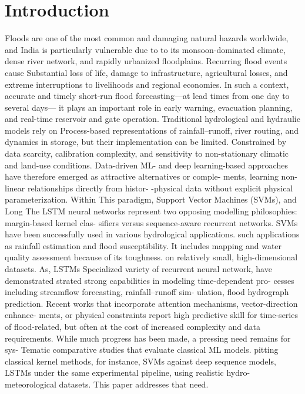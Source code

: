\documentclass[conference]{IEEEtran}
\begin{document}
\section{Introduction}
Floods are one of the most common and damaging natural
hazards worldwide, and India is particularly vulnerable due to
to its monsoon-dominated climate, dense river network, and
rapidly urbanized floodplains. Recurring flood events cause
Substantial loss of life, damage to infrastructure, agricultural
losses, and extreme interruptions to livelihoods and regional
economies. In such a context, accurate and timely short-run
flood forecasting—at lead times from one day to several days—
it plays an important role in early warning, evacuation planning, and
real-time reservoir and gate operation.
Traditional hydrological and hydraulic models rely on
Process-based representations of rainfall–runoff, river routing,
and dynamics in storage, but their implementation can be limited.
Constrained by data scarcity, calibration complexity, and sensitivity to
non-stationary climatic and land-use conditions. Data-driven
ML- and deep learning-based approaches
have therefore emerged as attractive alternatives or comple-
ments, learning non-linear relationships directly from histor-
-physical data without explicit physical parameterization. Within
This paradigm, Support Vector Machines (SVMs), and Long
The LSTM neural networks represent two
opposing modelling philosophies: margin-based kernel clas-
sifiers versus sequence-aware recurrent networks.
SVMs have been successfully used in various hydrological applications.
such applications as rainfall estimation and flood susceptibility.
It includes mapping and water quality assessment because of its toughness.
on relatively small, high-dimensional datasets. As, LSTMs
Specialized variety of recurrent neural network, have demonstrated
strated strong capabilities in modeling time-dependent pro-
cesses including streamflow forecasting, rainfall–runoff sim-
ulation, flood hydrograph prediction. Recent works that
incorporate attention mechanisms, vector-direction enhance-
ments, or physical constraints report high predictive skill for
time-series of flood-related, but often at the cost of increased
complexity and data requirements.
While much progress has been made, a pressing need remains for sys-
Tematic comparative studies that evaluate classical ML models.
pitting classical kernel methods, for instance, SVMs against deep sequence models, LSTMs
under the same experimental pipeline, using realistic
hydro-meteorological datasets. This paper addresses that need.
\end{document}
